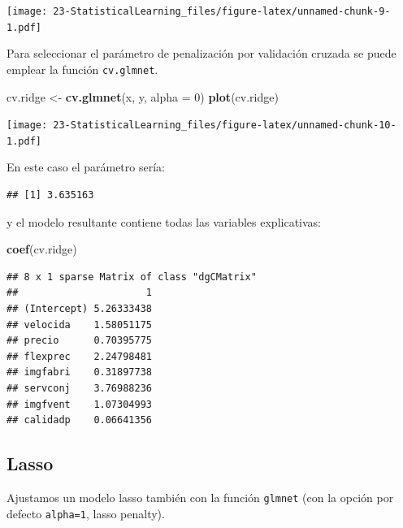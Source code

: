 \documentclass[]{book}
\newenvironment{Shaded}{\begin{snugshade}}{\end{snugshade}}
\newcommand{\KeywordTok}[1]{\textcolor[rgb]{0.13,0.29,0.53}{\textbf{#1}}}
\newcommand{\DataTypeTok}[1]{\textcolor[rgb]{0.13,0.29,0.53}{#1}}
\newcommand{\DecValTok}[1]{\textcolor[rgb]{0.00,0.00,0.81}{#1}}
\newcommand{\StringTok}[1]{\textcolor[rgb]{0.31,0.60,0.02}{#1}}
\newcommand{\OperatorTok}[1]{\textcolor[rgb]{0.81,0.36,0.00}{\textbf{#1}}}
\newcommand{\NormalTok}[1]{#1}
\begin{document}
\texttt{[image: 23-StatisticalLearning\_files/figure-latex/unnamed-chunk-9-1.pdf]}

Para seleccionar el parámetro de penalización por validación cruzada se
puede emplear la función \texttt{cv.glmnet}.

\begin{Shaded}
\begin{Highlighting}[]
\NormalTok{cv.ridge <-}\StringTok{ }\KeywordTok{cv.glmnet}\NormalTok{(x, y, }\DataTypeTok{alpha =} \DecValTok{0}\NormalTok{)}
\KeywordTok{plot}\NormalTok{(cv.ridge)}
\end{Highlighting}
\end{Shaded}

\texttt{[image: 23-StatisticalLearning\_files/figure-latex/unnamed-chunk-10-1.pdf]}

En este caso el parámetro sería:

\begin{Shaded}
\end{Shaded}

\begin{verbatim}
## [1] 3.635163
\end{verbatim}

y el modelo resultante contiene todas las variables explicativas:

\begin{Shaded}
\begin{Highlighting}[]
\KeywordTok{coef}\NormalTok{(cv.ridge)}
\end{Highlighting}
\end{Shaded}

\begin{verbatim}
## 8 x 1 sparse Matrix of class "dgCMatrix"
##                      1
## (Intercept) 5.26333438
## velocida    1.58051175
## precio      0.70395775
## flexprec    2.24798481
## imgfabri    0.31897738
## servconj    3.76988236
## imgfvent    1.07304993
## calidadp    0.06641356
\end{verbatim}

\subsection{Lasso}\label{lasso}

Ajustamos un modelo lasso también con la función \texttt{glmnet} (con la
opción por defecto \texttt{alpha=1}, lasso penalty).
\end{document}
